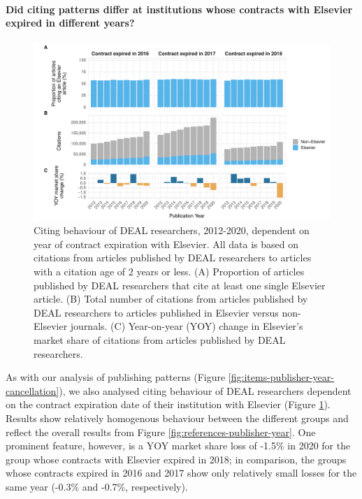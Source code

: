 \documentclass[
]{article}
\begin{document}
\hypertarget{did-citing-patterns-differ-at-institutions-whose-contracts-with-elsevier-expired-in-different-years}{%
\paragraph{Did citing patterns differ at institutions whose contracts with Elsevier expired in different years?}\label{did-citing-patterns-differ-at-institutions-whose-contracts-with-elsevier-expired-in-different-years}}

\begin{figure}

{\centering \includegraphics[width=0.833\linewidth]{analysis_files/figure-latex/references-publisher-year-cancellation-1} 

}

\caption{Citing behaviour of DEAL researchers, 2012-2020, dependent on year of contract expiration with Elsevier. All data is based on citations from articles published by DEAL researchers to articles with a citation age of 2 years or less. (A) Proportion of articles published by DEAL researchers that cite at least one single Elsevier article. (B) Total number of citations from articles published by DEAL researchers to articles published in Elsevier versus non-Elsevier journals. (C) Year-on-year (YOY) change in Elsevier's market share of citations from articles published by DEAL researchers.}\label{fig:references-publisher-year-cancellation}
\end{figure}

As with our analysis of publishing patterns (Figure \ref{fig:items-publisher-year-cancellation}), we also analysed citing behaviour of DEAL researchers dependent on the contract expiration date of their institution with Elsevier (Figure \ref{fig:references-publisher-year-cancellation}). Results show relatively homogenous behaviour between the different groups and reflect the overall results from Figure \ref{fig:references-publisher-year}. One prominent feature, however, is a YOY market share loss of -1.5\% in 2020 for the group whose contracts with Elsevier expired in 2018; in comparison, the groups whose contracts expired in 2016 and 2017 show only relatively small losses for the same year (-0.3\% and -0.7\%, respectively).
\end{document}
